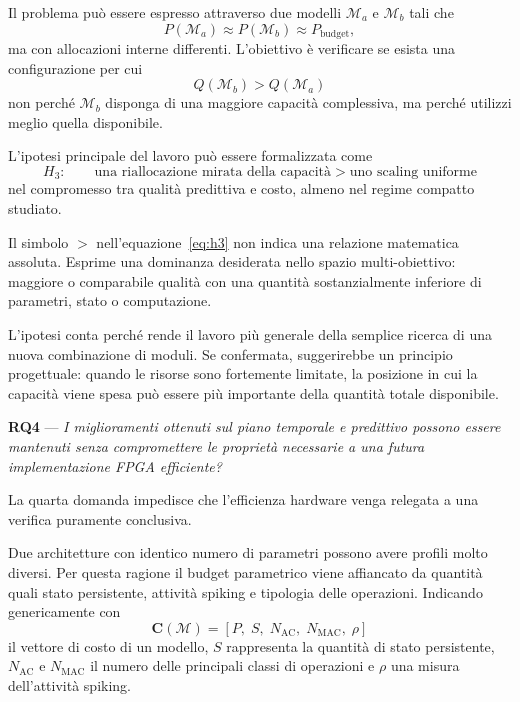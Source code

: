 Il problema può essere espresso attraverso due modelli $\mathcal{M}_a$ e $\mathcal{M}_b$ tali che
\begin{equation*}
P(\mathcal{M}_a) \approx P(\mathcal{M}_b) \approx P_{\mathrm{budget}},
\end{equation*}
ma con allocazioni interne differenti. L'obiettivo è verificare se esista una configurazione per cui
\begin{equation}
\label{eq:confronto_qualita}
Q(\mathcal{M}_b) > Q(\mathcal{M}_a)
\end{equation}
non perché $\mathcal{M}_b$ disponga di una maggiore capacità complessiva, ma perché utilizzi meglio quella disponibile.

L'ipotesi principale del lavoro può essere formalizzata come
\begin{equation}
\label{eq:h3}
H_3: \qquad \text{una riallocazione mirata della capacità} > \text{uno scaling uniforme}
\end{equation}
nel compromesso tra qualità predittiva e costo, almeno nel regime compatto studiato.

Il simbolo $>$ nell'equazione~\eqref{eq:h3} non indica una relazione matematica assoluta. Esprime una dominanza desiderata nello spazio multi-obiettivo: maggiore o comparabile qualità con una quantità sostanzialmente inferiore di parametri, stato o computazione.

L'ipotesi conta perché rende il lavoro più generale della semplice ricerca di una nuova combinazione di moduli. Se confermata, suggerirebbe un principio progettuale: quando le risorse sono fortemente limitate, la posizione in cui la capacità viene spesa può essere più importante della quantità totale disponibile.

\vspace{0.8em}
\noindent\textbf{RQ4} --- \emph{I miglioramenti ottenuti sul piano temporale e predittivo possono essere mantenuti senza compromettere le proprietà necessarie a una futura implementazione FPGA efficiente?}

La quarta domanda impedisce che l'efficienza hardware venga relegata a una verifica puramente conclusiva.

Due architetture con identico numero di parametri possono avere profili molto diversi. Per questa ragione il budget parametrico viene affiancato da quantità quali stato persistente, attività spiking e tipologia delle operazioni. Indicando genericamente con
\begin{equation}
\label{eq:vettore_costo}
\mathbf{C}(\mathcal{M}) = \left[ P,\; S,\; N_{\mathrm{AC}},\; N_{\mathrm{MAC}},\; \rho \right]
\end{equation}
il vettore di costo di un modello, $S$ rappresenta la quantità di stato persistente, $N_{\mathrm{AC}}$ e $N_{\mathrm{MAC}}$ il numero delle principali classi di operazioni e $\rho$ una misura dell'attività spiking.

